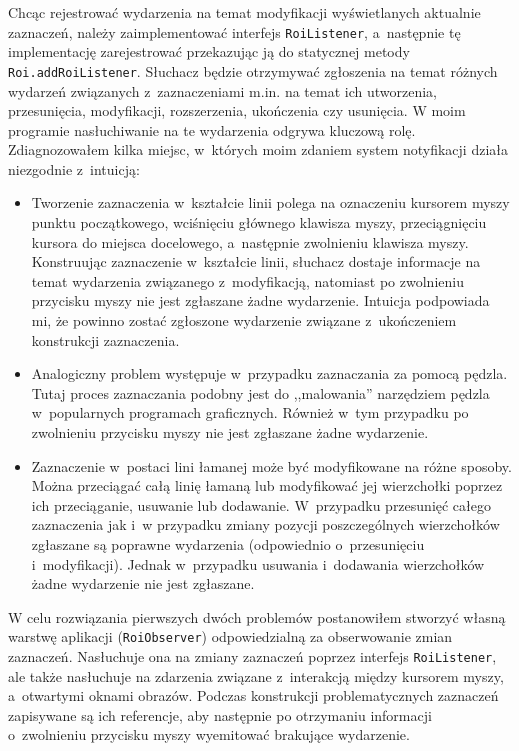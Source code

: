 \documentclass[declaration,shortabstract,mgr]{iithesis}
\begin{document}
Chcąc rejestrować wydarzenia na temat modyfikacji wyświetlanych aktualnie zaznaczeń, należy zaimplementować interfejs \texttt{RoiListener}, a~następnie tę implementację zarejestrować przekazując ją do statycznej metody \texttt{Roi.addRoiListener}.
Słuchacz będzie otrzymywać zgłoszenia na temat różnych wydarzeń związanych z~zaznaczeniami m.in. na temat ich utworzenia, przesunięcia, modyfikacji, rozszerzenia, ukończenia czy usunięcia.
W moim programie nasłuchiwanie na te wydarzenia odgrywa kluczową rolę.
Zdiagnozowałem kilka miejsc, w~których moim zdaniem system notyfikacji działa niezgodnie z~intuicją:
\begin{itemize}
  \item Tworzenie zaznaczenia w~kształcie linii polega na oznaczeniu kursorem myszy punktu początkowego, wciśnięciu głównego klawisza myszy, przeciągnięciu kursora do miejsca docelowego, a~następnie zwolnieniu klawisza myszy. Konstruując zaznaczenie w~kształcie linii, słuchacz dostaje informacje na temat wydarzenia związanego z~modyfikacją, natomiast po zwolnieniu przycisku myszy nie jest zgłaszane żadne wydarzenie. Intuicja podpowiada mi, że powinno zostać zgłoszone wydarzenie związane z~ukończeniem konstrukcji zaznaczenia.
  \item Analogiczny problem występuje w~przypadku zaznaczania za pomocą pędzla. Tutaj proces zaznaczania podobny jest do ,,malowania'' narzędziem pędzla w~popularnych programach graficznych. Również w~tym przypadku po zwolnieniu przycisku myszy nie jest zgłaszane żadne wydarzenie.
  \item Zaznaczenie w~postaci lini łamanej może być modyfikowane na różne sposoby. Można przeciągać całą linię łamaną lub modyfikować jej wierzchołki poprzez ich przeciąganie, usuwanie lub dodawanie. W~przypadku przesunięć całego zaznaczenia jak i~w przypadku zmiany pozycji poszczególnych wierzchołków zgłaszane są poprawne wydarzenia (odpowiednio o~przesunięciu i~modyfikacji). Jednak w~przypadku usuwania i~dodawania wierzchołków żadne wydarzenie nie jest zgłaszane.
\end{itemize}

W celu rozwiązania pierwszych dwóch problemów postanowiłem stworzyć własną warstwę aplikacji (\texttt{RoiObserver}) odpowiedzialną za obserwowanie zmian zaznaczeń.
Nasłuchuje ona na zmiany zaznaczeń poprzez interfejs \texttt{RoiListener}, ale także nasłuchuje na zdarzenia związane z~interakcją między kursorem myszy, a~otwartymi oknami obrazów.
Podczas konstrukcji problematycznych zaznaczeń zapisywane są ich referencje, aby następnie po otrzymaniu informacji o~zwolnieniu przycisku myszy wyemitować brakujące wydarzenie.
\end{document}
